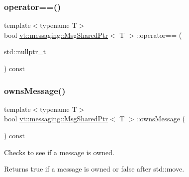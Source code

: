 \subsubsection{\texorpdfstring{operator==()}{operator==()}\hspace{0.1cm}{\footnotesize\ttfamily [2/2]}}
{\footnotesize\ttfamily template$<$typename T$>$ \\
bool \hyperlink{structvt_1_1messaging_1_1_msg_shared_ptr}{vt\+::messaging\+::\+Msg\+Shared\+Ptr}$<$ T $>$\+::operator== (\begin{DoxyParamCaption}\item[{std\+::nullptr\+\_\+t}]{ }\end{DoxyParamCaption}) const\hspace{0.3cm}{\ttfamily [inline]}}

\mbox{\label{structvt_1_1messaging_1_1_msg_shared_ptr_aea0124e8c6c53e91f3239a8ecf3cdca8}} 
\subsubsection{\texorpdfstring{owns\+Message()}{ownsMessage()}}
{\footnotesize\ttfamily template$<$typename T$>$ \\
bool \hyperlink{structvt_1_1messaging_1_1_msg_shared_ptr}{vt\+::messaging\+::\+Msg\+Shared\+Ptr}$<$ T $>$\+::owns\+Message (\begin{DoxyParamCaption}{ }\end{DoxyParamCaption}) const\hspace{0.3cm}{\ttfamily [inline]}}



Checks to see if a message is owned. 

\begin{DoxyReturn}{Returns}
{\ttfamily true} if a message is owned or {\ttfamily false} after std\+::move. 
\end{DoxyReturn}
\mbox{\label{structvt_1_1messaging_1_1_msg_shared_ptr_a604694c988590bdb3a35e403c677cba2}} 
